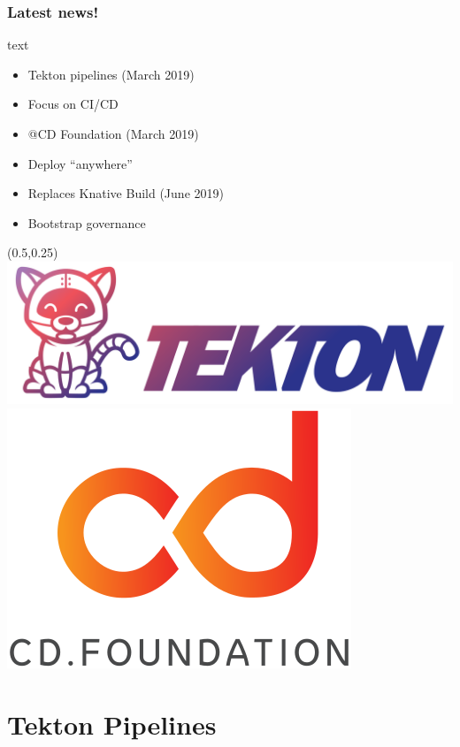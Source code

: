 \documentclass[aspectratio=169,11pt,hyperref={colorlinks=true}]{beamer}
\begin{document}
\begin{lblackrwhiteframe}
\begin{lblackrwhiteframe}
  \frametitle{Latest news!}
  \large
  \begin{beamercolorbox}[wd=0.35\paperwidth]{text}
    \begin{itemize}
      \item Tekton pipelines (March 2019)
      \item Focus on CI/CD
      \item @CD Foundation  (March 2019)
      \item Deploy ``anywhere''
      \item Replaces Knative Build (June 2019)
      \item Bootstrap governance
    \end{itemize}
  \end{beamercolorbox}%
  \begin{textblock*}{0.5\paperwidth}(0.5\paperwidth,0.25\paperheight)
    \centering
    \includegraphics[width=0.35\paperwidth]{img/tekton-horizontal-color.png}
    \includegraphics[width=0.20\paperwidth]{img/cdf-color.png}
  \end{textblock*}
\end{lblackrwhiteframe}

\section{Tekton Pipelines}


\end{lblackrwhiteframe}
\end{document}
